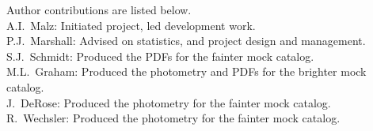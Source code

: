 Author contributions are listed below. \\
A.I.~Malz: Initiated project, led development work. \\
P.J.~Marshall: Advised on statistics, and project design and management. \\
S.J.~Schmidt: Produced the PDFs for the fainter mock catalog. \\
M.L.~Graham: Produced the photometry and PDFs for the brighter mock catalog. \\
J.~DeRose: Produced the photometry for the fainter mock catalog. \\
R.~Wechsler: Produced the photometry for the fainter mock catalog. \\
